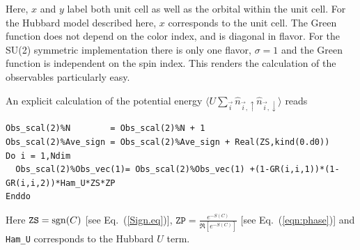 Here,   $x$ and $y$ label  both unit cell as well as the orbital within the unit cell. For the Hubbard model described here, $x$ corresponds to the unit cell.  The Green function  does not depend on the color index, and is diagonal in flavor.  For the SU(2) symmetric implementation  there is only one flavor, $\sigma = 1$ and the Green function is  independent on the spin index.  This renders the calculation of the observables particularly easy.   

An explicit calculation of the   potential energy  $ \langle U \sum_{\vec{i}}  \hat{n}_{\vec{i},\uparrow}   \hat{n}_{\vec{i},\downarrow}  \rangle $ reads 
\begin{lstlisting}[style=fortran]
Obs_scal(2)%N        = Obs_scal(2)%N + 1
Obs_scal(2)%Ave_sign = Obs_scal(2)%Ave_sign + Real(ZS,kind(0.d0))
Do i = 1,Ndim
  Obs_scal(2)%Obs_vec(1)= Obs_scal(2)%Obs_vec(1) +(1-GR(i,i,1))*(1-GR(i,i,2))*Ham_U*ZS*ZP
Enddo
\end{lstlisting} 
Here  $ \texttt{ZS} = \operatorname{sgn}(C) $  [see Eq.~(\ref{Sign.eq})],  $ \texttt{ZP} =   \frac{e^{-S(C)}} {\Re \left[e^{-S(C)} \right]}   $ [see Eq.~(\ref{eqn:phase})] and  \texttt{Ham\_U}  corresponds to the Hubbard  $U$ term.

